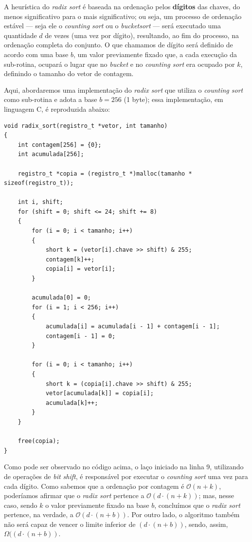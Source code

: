 \documentclass[fontsize=10pt]{article}
\begin{document}
\quad A heurística do \textit{radix sort} é baseada na ordenação pelos \textbf{dígitos} das chaves, do menos significativo para o mais significativo; ou seja, um processo de ordenação estável — seja ele o \textit{counting sort} ou o \textit{bucketsort} — será executado uma quantidade $d$ de vezes (uma vez por dígito), resultando, ao fim do processo, na ordenação completa do conjunto. O que chamamos de dígito será definido de acordo com uma base $b$, um valor previamente fixado que, a cada execução da sub-rotina, ocupará o lugar que no \textit{bucket} e no \textit{counting sort} era ocupado por $k$, definindo o tamanho do vetor de contagem.

\quad Aqui, abordaremos uma implementação do \textit{radix sort} que utiliza o \textit{counting sort} como sub-rotina e adota a base $b = 256$ (1 byte); essa implementação, em linguagem C, é reproduzida abaixo:

\begin{lstlisting}
void radix_sort(registro_t *vetor, int tamanho)
{
    int contagem[256] = {0};
    int acumulada[256];
    
    registro_t *copia = (registro_t *)malloc(tamanho * sizeof(registro_t));

    int i, shift;
    for (shift = 0; shift <= 24; shift += 8) 
    {
        for (i = 0; i < tamanho; i++)
        {
            short k = (vetor[i].chave >> shift) & 255;
            contagem[k]++;
            copia[i] = vetor[i];
        }

        acumulada[0] = 0;
        for (i = 1; i < 256; i++)
        {
            acumulada[i] = acumulada[i - 1] + contagem[i - 1];
            contagem[i - 1] = 0;
        }

        for (i = 0; i < tamanho; i++)
        {
            short k = (copia[i].chave >> shift) & 255;
            vetor[acumulada[k]] = copia[i];
            acumulada[k]++;
        }
    }

    free(copia);
}
\end{lstlisting}

\quad Como pode ser observado no código acima, o laço iniciado na linha 9, utilizando de operações de \textit{bit shift}, é responsável por executar o \textit{counting sort} uma vez para cada dígito. Como sabemos que a ordenação por contagem é $\mathcal{O}(n + k)$, poderíamos afirmar que o \textit{radix sort} pertence a $\mathcal{O}(d \cdot (n + k))$; mas, nesse caso, sendo $k$ o valor previamente fixado na base $b$, concluímos que o \textit{radix sort} pertence, na verdade, a $\mathcal{O}(d \cdot (n + b))$. Por outro lado, o algoritmo também não será capaz de vencer o limite inferior de $(d \cdot (n + b))$, sendo, assim, $\Omega((d \cdot (n + b))$.
\end{document}
